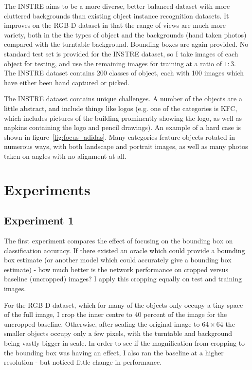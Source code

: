 The INSTRE \cite{Wang2015} aims to be a more diverse, better balanced dataset with more cluttered backgrounds than existing object instance recognition datasets. It improves on the RGB-D dataset in that the range of views are much more variety, both in the the types of object and the backgrounds (hand taken photos) compared with the turntable background. Bounding boxes are again provided. No standard test set is provided for the INSTRE dataset, so I take images of each object for testing, and use the remaining images for training at a ratio of $1:3$. The INSTRE dataset contains 200 classes of object, each with 100 images which have either been hand captured or picked. 

The INSTRE dataset contains unique challenges. A number of the objects are a little abstract, and include things like logos (e.g. one of the categories is KFC, which includes pictures of the building prominently showing the logo, as well as napkins containing the logo and pencil drawings). An example of a hard case is shown in figure~\ref{fig:focus_adidas}. Many categories feature objects rotated in numerous ways, with both landscape and portrait images, as well as many photos taken on angles with no alignment at all.

\section {Experiments}


\subsection {Experiment 1}

The first experiment compares the effect of focusing on the bounding box on classification accuracy. If there existed an oracle which could provide a bounding box estimate (or another model which could accurately give a bounding box estimate) - how much better is the network performance on cropped versus baseline (uncropped) images? I apply this cropping equally on test and training images.

For the RGB-D dataset, which for many of the objects only occupy a tiny space of the full image, I crop the inner centre to 40 percent of the image for the uncropped baseline. Otherwise, after scaling the original image to $ 64 \times 64 $ the smaller objects occupy only a few pixels, with the turntable and background being vastly bigger in scale. In order to see if the magnification from cropping to the bounding box was having an effect, I also ran the baseline at a higher resolution - but noticed little change in performance.


